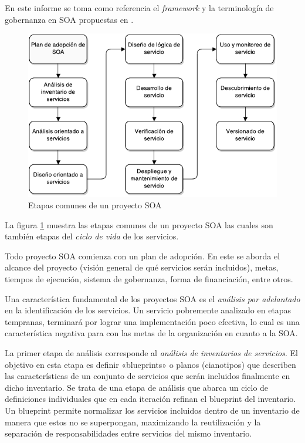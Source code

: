\documentclass[11pt]{article}
\begin{document}
		En este informe se toma como referencia el \emph{framework} y la terminología de gobernanza en SOA propuestas en \cite{Erl:2011:SGG:1983453}.

		\begin{figure}[h]
			\centering
			\includegraphics[width=\linewidth]{ciclo_de_vida_del_proyecto}
			\caption{Etapas comunes de un proyecto SOA}
			\label{figura:ciclo_de_vida_del_proyecto}
		\end{figure}

		La figura \ref{figura:ciclo_de_vida_del_proyecto} muestra las etapas comunes de un proyecto SOA las cuales son también etapas del \emph{ciclo de vida} de los servicios.

		Todo proyecto SOA comienza con un plan de adopción. En este se aborda el alcance del proyecto (visión general de qué servicios serán incluidos), metas, tiempos de ejecución, sistema de gobernanza, forma de financiación, entre otros.

		Una característica fundamental de los proyectos SOA es el \emph{análisis por adelantado} en la identificación de los servicios. Un servicio pobremente analizado en etapas tempranas, terminará por lograr una implementación poco efectiva, lo cual es una característica negativa para con las metas de la organización en cuanto a la SOA.

		La primer etapa de análisis corresponde al \emph{análisis de inventarios de servicios}. El objetivo en esta etapa es definir «blueprints» o planos (cianotipos) que describen las características de un conjunto de servicios que serán incluidos finalmente en dicho inventario. Se trata de una etapa de análisis que abarca un ciclo de definiciones individuales que en cada iteración refinan el blueprint del inventario. Un blueprint permite normalizar los servicios incluidos dentro de un inventario de manera que estos no se superpongan, maximizando la reutilización y la separación de responsabilidades entre servicios del mismo inventario. \cite{Erl:2011:SGG:1983453}
\end{document}
